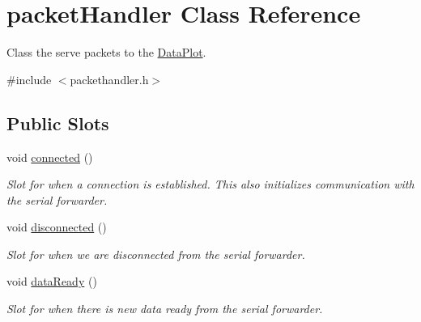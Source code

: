 \hypertarget{classpacketHandler}{
\section{packetHandler Class Reference}
\label{classpacketHandler}
}


Class the serve packets to the \hyperlink{classDataPlot}{DataPlot}.  




{\ttfamily \#include $<$packethandler.h$>$}

\subsection*{Public Slots}
\begin{DoxyCompactItemize}
\item 
\hypertarget{classpacketHandler_ab1a61d0c1deef1885e31b9a6aebdcc2f}{
void \hyperlink{classpacketHandler_ab1a61d0c1deef1885e31b9a6aebdcc2f}{connected} ()}
\label{classpacketHandler_ab1a61d0c1deef1885e31b9a6aebdcc2f}

\begin{DoxyCompactList}\small\item\em Slot for when a connection is established. This also initializes communication with the serial forwarder. \item\end{DoxyCompactList}\item 
void \hyperlink{classpacketHandler_a43223a8930a6af8c40c5889d8e4b9d4b}{disconnected} ()
\begin{DoxyCompactList}\small\item\em Slot for when we are disconnected from the serial forwarder. \item\end{DoxyCompactList}\item 
void \hyperlink{classpacketHandler_a9085a61a51eccc7acb240a7b68601686}{dataReady} ()
\begin{DoxyCompactList}\small\item\em Slot for when there is new data ready from the serial forwarder. \item\end{DoxyCompactList}\end{DoxyCompactItemize}
